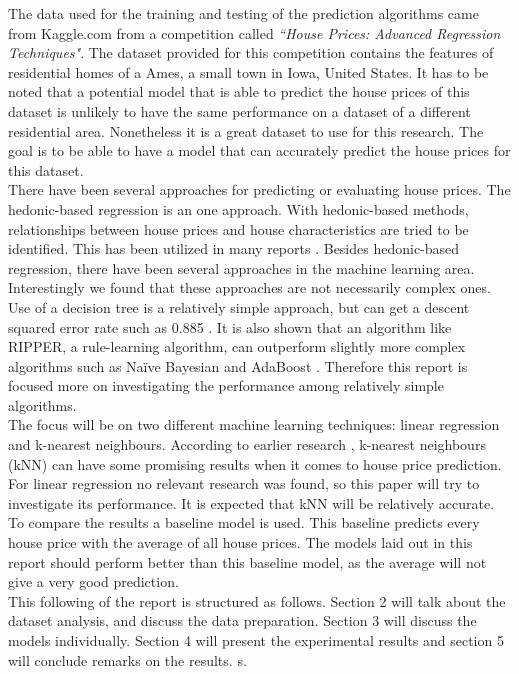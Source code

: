 \documentclass[a4paper,11pt]{article}
\begin{document}
The data used for the training and testing of the prediction algorithms came from Kaggle.com from a competition called \textit{“House Prices: Advanced Regression Techniques"}. The dataset provided for this competition contains the features of residential homes of a Ames, a small town in Iowa, United States. It has to be noted that a potential model that is able to predict the house prices of this dataset is unlikely to have the same performance on a dataset of a different residential area. Nonetheless it is a great dataset to use for this research. The goal is to be able to have a model that can accurately predict the house prices for this dataset.\\

    There have been several approaches for predicting or evaluating house prices. The hedonic-based regression is an one approach. With hedonic-based methods, relationships between house prices and house characteristics are tried to be identified. This has been utilized in many reports \cite{adair_berry_mcgreal_1996, stevenson_2004, bin_2004}. Besides hedonic-based regression, there have been several approaches in the machine learning area. Interestingly we found that these approaches are not necessarily complex ones. Use of a decision tree is a relatively simple approach, but can get a descent squared error rate such as 0.885 \cite{fan_ong_koh_2006}. It is also shown that an algorithm like RIPPER, a rule-learning algorithm, can outperform slightly more complex algorithms such as Naïve Bayesian and AdaBoost \cite{park_bae_2015}. Therefore this report is focused more on investigating the performance among relatively simple algorithms. \\
 
The focus will be on two different machine learning techniques: linear regression and k-nearest neighbours. According to earlier research \cite{zhao_sun_wang_2014}, k-nearest neighbours (kNN) can have some promising results when it comes to house price prediction. For linear regression no relevant research was found, so this paper will try to investigate its performance. It is expected that kNN will be relatively accurate. To compare the results a baseline model is used. This baseline predicts every house price with the average of all house prices. The models laid out in this report should perform better than this baseline model, as the average will not give a very good prediction. \\

This following of the report is structured as follows. Section 2 will talk about the dataset analysis, and discuss the data preparation. Section 3 will discuss the models individually. Section 4 will present the experimental results and section 5 will conclude remarks on the results. 
s. 
\end{document}
